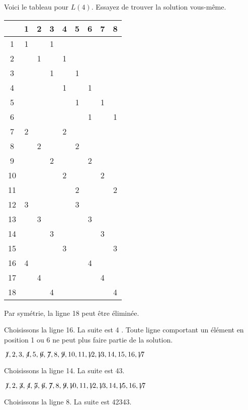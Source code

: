 Voici le tableau pour $L(4)$. Essayez de trouver la solution vous-même.
\begin{center}
\addtolength{\tabcolsep}{4pt}
\begin{tabular}{|c||c|c|c|c|c|c|c|c|}
\hline
&1&2&3&4&5&6&7&8\\\hline\hline
1&1&&1&&&&&\\\hline
2&&1&&1&&&&\\\hline
3&&&1&&1&&&\\\hline
4&&&&1&&1&&\\\hline
5&&&&&1&&1&\\\hline
6&&&&&&1&&1\\\hline
7&2&&&2&&&&\\\hline
8&&2&&&2&&&\\\hline
9&&&2&&&2&&\\\hline
10&&&&2&&&2&\\\hline
11&&&&&2&&&2\\\hline
12&3&&&&3&&&\\\hline
13&&3&&&&3&&\\\hline
14&&&3&&&&3&\\\hline
15&&&&3&&&&3\\\hline
16&4&&&&&4&&\\\hline
17&&4&&&&&4&\\\hline
18&&&4&&&&&4\\\hline
\end{tabular}
\end{center}
Par symétrie, la ligne 18 peut être éliminée.

\smallskip

\noindent Choisissons la ligne 16. La suite est 4 \textvisiblespace\textvisiblespace\textvisiblespace{} \textvisiblespace\textvisiblespace.
Toute ligne comportant un élément en position 1 ou 6 ne peut plus faire partie de la solution.

$\not\! 1,2,3,\not\! 4,5,\not\! 6,\not\! 7,8,\not\! 9,10,11,\not\!\! 12,\not\!\! 13,14,15,16,\not\!\! 17$

\noindent Choisissons la ligne 14. La suite est  4\textvisiblespace{}3\textvisiblespace.

$\not\! 1,2,\not\! 3,\not\! 4,\not\! 5,\not\! 6,\not\! 7,8,\not\! 9,\not\!\! 10,11,\not\!\! 12,\not\!\! 13,14, \not\!\! 15,16,\not\!\! 17$

\noindent Choisissons la ligne 8. La suite est   4{}2{}34{}3\textvisiblespace.

